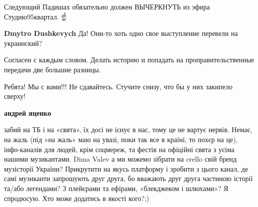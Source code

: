 \begin{itemize}
\begin{itemize}
\end{itemize}

 

Следующий Падишах обязательно должен ВЫЧЕРКНУТЬ из эфира Студию95квартал. ☝️

\begin{itemize}
 
\textbf{Dmytro Dushkevych} Да! Они-то хоть одно свое выступление перевели на украинский? 🤔
\end{itemize}

 
Согласен с каждым словом.
Делать историю и попадать на проправительственные передачи две большие разницы.

 
Ребята! Мы с вами!!! Не сдавайтесь. Стучите снизу, что бы у них закипело сверху!

 
\textbf{андрей яценко} 

забий на ТБ і на «свята», їх досі не існує в нас, тому це не вартує нервів.
Немає, на жаль (під «на жаль» маю на увазі, поки так все в країні, то похєр на
це), інфо-каналів для людей, крім соцмереж, та фестів на офіційні свята з усіма
нашими музикантами. Dima Valev а ми можемо зібрати на crello свій бренд
музісторії України? Прикрутити на якусь платформу і зробити з цього канал, де
самі музиканти запрошують друг друга, бо вважають друг друга частиною історії
та/або легендами? З плейєрами та ефірами, «блекджеком і шлюхами»? Я спродюсую.
Хто може додатись в якості кого?;)


\end{itemize}
